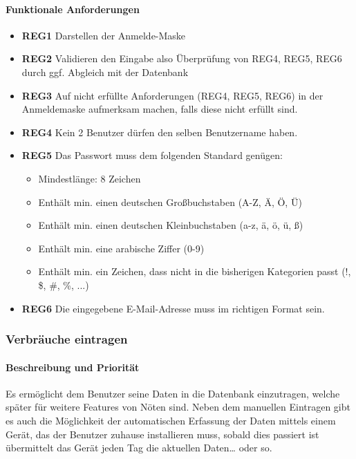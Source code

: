 \paragraph{Funktionale Anforderungen}
\begin{itemize}
	\item \textbf{REG1} Darstellen der Anmelde-Maske
	\item \textbf{REG2} Validieren den Eingabe also Überprüfung von REG4, REG5, REG6  durch ggf. Abgleich mit der Datenbank
	\item \textbf{REG3} Auf nicht erfüllte Anforderungen (REG4, REG5, REG6) in der Anmeldemaske aufmerksam machen, falls diese nicht erfüllt sind.
	\item \textbf{REG4} Kein 2 Benutzer dürfen den selben Benutzername haben.
	\item \textbf{REG5} Das Passwort muss dem folgenden Standard genügen:
	\begin{itemize}
		\item Mindestlänge: 8 Zeichen
		\item Enthält min. einen deutschen Großbuchstaben (A-Z, Ä, Ö, Ü)
		\item Enthält min. einen deutschen Kleinbuchstaben (a-z, ä, ö, ü, ß)
		\item Enthält min. eine arabische Ziffer (0-9)
		\item Enthält min. ein Zeichen, dass nicht in die bisherigen Kategorien passt (!, \$, \#, \%, ...)
	\end{itemize}
	\item \textbf{REG6} Die eingegebene E-Mail-Adresse muss im richtigen Format sein.
	
\end{itemize}

\subsubsection{Verbräuche eintragen}
\label{sysf:verb_eintragen}
\paragraph{Beschreibung und Priorität}
Es ermöglicht dem Benutzer seine Daten in die Datenbank einzutragen, welche später für weitere Features von Nöten sind. Neben dem manuellen Eintragen gibt es auch die Möglichkeit der automatischen Erfassung der Daten mittels einem Gerät, das der Benutzer zuhause installieren muss, sobald dies passiert ist übermittelt das Gerät jeden Tag die aktuellen Daten… oder so.

